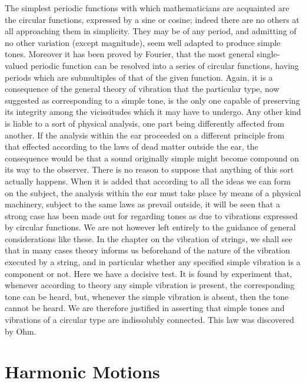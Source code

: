 The simplest periodic functions with which mathematicians are acquainted are
the circular functions, expressed by a sine or cosine; indeed there are no
others at all approaching them in simplicity. They may be of any period, and
admitting of no other variation (except magnitude), seem well adapted to
produce simple tones. Moreover it has been proved by Fourier, that the most
general single-valued periodic function can be resolved into a series of
circular functions, having periods which are submultiples of that of the given
function. Again, it is a consequence of the general theory of vibration that
the particular type, now suggested as corresponding to a simple tone, is the
only one capable of preserving its integrity among the vicissitudes which it
may have to undergo. Any other kind is liable to a sort of physical analysis,
one part being differently affected from another. If the analysis within the
ear proceeded on a different principle from that effected according to the laws
of dead matter outside the ear, the consequence would be that a sound
originally simple might become compound on its way to the observer. There is no
reason to suppose that anything of this sort actually happens. When it is added
that according to all the ideas we can form on the subject, the analysis within
the ear must take place by means of a physical machinery, subject to the same
laws as prevail outside, it will be seen that a strong case has been made out
for regarding tones as due to vibrations expressed by circular functions. We
are not however left entirely to the guidance of general considerations like
these. In the chapter on the vibration of strings, we shall see that in many
cases theory informs us beforehand of the nature of the vibration executed by a
string, and in particular whether any specified simple vibration is a component
or not. Here we have a decisive test. It is found by experiment that, whenever
according to theory any simple vibration is present, the corresponding tone can
be heard, but, whenever the simple vibration is absent, then the tone cannot be
heard. We are therefore justified in asserting that simple tones and vibrations
of a circular type are indissolubly connected. This law was discovered by Ohm.

\chapter{Harmonic Motions}\label{harmonic-motions} %


